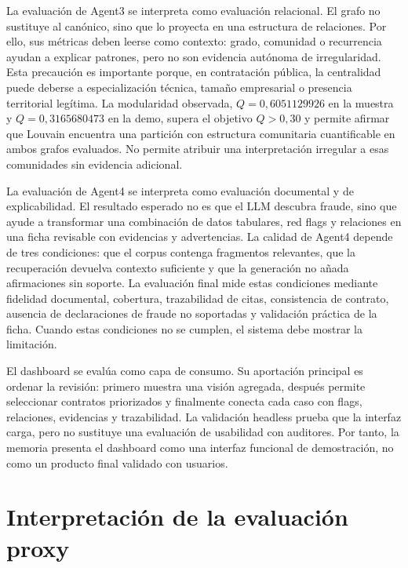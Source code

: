 \documentclass[11pt,a4paper,spanish]{book}
\numberwithin{equation}{chapter}
\numberwithin{figure}{chapter}
\begin{document}
La evaluaci{\'o}n de Agent3 se interpreta como evaluaci{\'o}n relacional. El grafo no sustituye al
can{\'o}nico, sino que lo proyecta en una estructura de relaciones. Por ello, sus m{\'e}tricas deben
leerse como contexto: grado, comunidad o recurrencia ayudan a explicar patrones, pero no son
evidencia aut{\'o}noma de irregularidad. Esta precauci{\'o}n es importante porque, en contrataci{\'o}n
p{\'u}blica, la centralidad puede deberse a especializaci{\'o}n t{\'e}cnica, tama{\~n}o empresarial o
presencia territorial leg{\'i}tima. La modularidad observada, $Q=0{,}6051129926$ en la muestra y
$Q=0{,}3165680473$ en la demo, supera el objetivo $Q>0{,}30$ y permite afirmar que Louvain encuentra
una partici{\'o}n con estructura comunitaria cuantificable en ambos grafos evaluados. No permite
atribuir una interpretaci{\'o}n irregular a esas comunidades sin evidencia adicional.

La evaluaci{\'o}n de Agent4 se interpreta como evaluaci{\'o}n documental y de explicabilidad. El
resultado esperado no es que el LLM descubra fraude, sino que ayude a transformar una combinaci{\'o}n
de datos tabulares, red flags y relaciones en una ficha revisable con evidencias y advertencias. La
calidad de Agent4 depende de tres condiciones: que el corpus contenga fragmentos relevantes, que la
recuperaci{\'o}n devuelva contexto suficiente y que la generaci{\'o}n no a{\~n}ada afirmaciones sin
soporte. La evaluaci{\'o}n final mide estas condiciones mediante fidelidad documental, cobertura,
trazabilidad de citas, consistencia de contrato, ausencia de declaraciones de fraude no soportadas y
validaci{\'o}n pr{\'a}ctica de la ficha. Cuando estas condiciones no se cumplen, el sistema debe mostrar
la limitaci{\'o}n.

El dashboard se eval{\'u}a como capa de consumo. Su aportaci{\'o}n principal es ordenar la revisi{\'o}n:
primero muestra una visi{\'o}n agregada, despu{\'e}s permite seleccionar contratos priorizados y
finalmente conecta cada caso con flags, relaciones, evidencias y trazabilidad. La validaci{\'o}n
headless prueba que la interfaz carga, pero no sustituye una evaluaci{\'o}n de usabilidad con auditores.
Por tanto, la memoria presenta el dashboard como una interfaz funcional de demostraci{\'o}n, no como
un producto final validado con usuarios.

\section{Interpretaci{\'o}n de la evaluaci{\'o}n proxy}
\label{sec:evaluacion_proxy}
\end{document}
